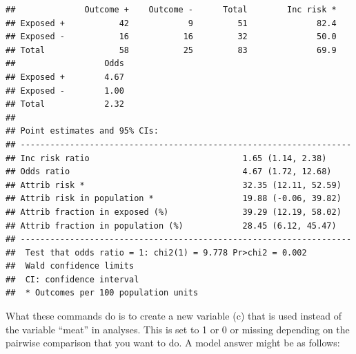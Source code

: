 \documentclass[]{book}
\newenvironment{Shaded}{\begin{snugshade}}{\end{snugshade}}
\newcommand{\CommentTok}[1]{\textcolor[rgb]{0.56,0.35,0.01}{\textit{#1}}}
\newcommand{\DataTypeTok}[1]{\textcolor[rgb]{0.13,0.29,0.53}{#1}}
\newcommand{\DecValTok}[1]{\textcolor[rgb]{0.00,0.00,0.81}{#1}}
\newcommand{\KeywordTok}[1]{\textcolor[rgb]{0.13,0.29,0.53}{\textbf{#1}}}
\newcommand{\NormalTok}[1]{#1}
\newcommand{\OperatorTok}[1]{\textcolor[rgb]{0.81,0.36,0.00}{\textbf{#1}}}
\newcommand{\StringTok}[1]{\textcolor[rgb]{0.31,0.60,0.02}{#1}}
\begin{document}
\begin{Shaded}
\end{Shaded}

\begin{verbatim}
##              Outcome +    Outcome -      Total        Inc risk *
## Exposed +           42            9         51              82.4
## Exposed -           16           16         32              50.0
## Total               58           25         83              69.9
##                  Odds
## Exposed +        4.67
## Exposed -        1.00
## Total            2.32
## 
## Point estimates and 95% CIs:
## -------------------------------------------------------------------
## Inc risk ratio                               1.65 (1.14, 2.38)
## Odds ratio                                   4.67 (1.72, 12.68)
## Attrib risk *                                32.35 (12.11, 52.59)
## Attrib risk in population *                  19.88 (-0.06, 39.82)
## Attrib fraction in exposed (%)               39.29 (12.19, 58.02)
## Attrib fraction in population (%)            28.45 (6.12, 45.47)
## -------------------------------------------------------------------
##  Test that odds ratio = 1: chi2(1) = 9.778 Pr>chi2 = 0.002
##  Wald confidence limits
##  CI: confidence interval
##  * Outcomes per 100 population units
\end{verbatim}

What these commands do is to create a new variable (c) that is used instead of the variable ``meat'' in analyses. This is set to 1 or 0 or missing depending on the pairwise comparison that you want to do. A model answer might be as follows:
\end{document}
